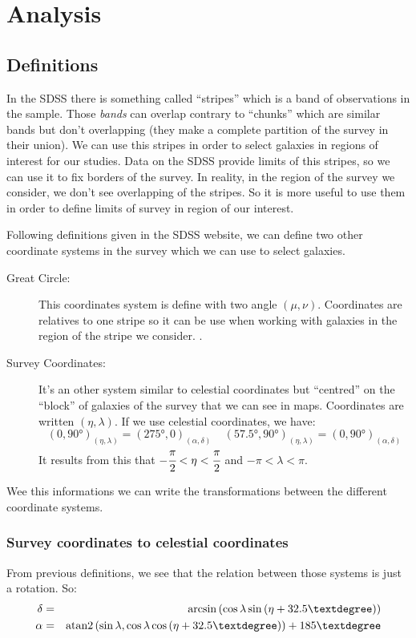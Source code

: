 \section{Analysis}
%
\subsection{Definitions}
%
In the SDSS there is something called ``stripes'' which is a band of
observations in the sample. Those \emph{bands} can overlap contrary to
``chunks'' which are similar bands but don't overlapping (they make a complete
partition of the survey in their union). We can use this stripes in order to
select galaxies in regions of interest for our studies. Data on the SDSS
provide limits of this stripes, so we can use it to fix borders of the survey.
In reality, in the region of the survey we consider, we don't see overlapping
of the stripes. So it is more useful to use them in order to define limits of
survey in region of our interest.

Following definitions given in the SDSS website, we can define two other
coordinate systems in the survey which we can use to select galaxies.
\begin{description}
    \item[Great Circle:] This coordinates system is define with two angle
        $(\mu, \nu)$. Coordinates are relatives to one stripe so it can be use
        when working with galaxies in the region of the stripe we consider.
        .

    \item[Survey Coordinates:] It's an other system similar to celestial
        coordinates but ``centred'' on the ``block'' of galaxies of the survey that
        we can see in maps. Coordinates are written $(\eta,\lambda)$. If we use
        celestial coordinates, we have:
    \begin{equation}
            {(0,90°)}_{(\eta,\lambda)}={(275°,0)}_{(\alpha,\delta)}\;\;\;\;
            {(57.5°,90°)}_{(\eta,\lambda)}={(0,90°)}_{(\alpha,\delta)}
    \end{equation}
    It results from this that $-\cfrac{\pi}{2}<\eta<\cfrac{\pi}{2}$ and $-\pi<\lambda<\pi$.
\end{description}

Wee this informations we can write the transformations between the different
coordinate systems.
%
\subsubsection{Survey coordinates to celestial coordinates}
%
From previous definitions, we see that the relation between those systems is
just a rotation. So:
\begin{eqnarray}
        \delta &=& \arcsin\pg\cos\lambda\sin\pg\eta+32.5°\pd\pd\nonumber\\
        \alpha &=& \mathrm{atan2}\pg\sin\lambda,\cos\lambda\cos\pg\eta+32.5°\pd\pd+185°\nonumber\\
\end{eqnarray}
%
